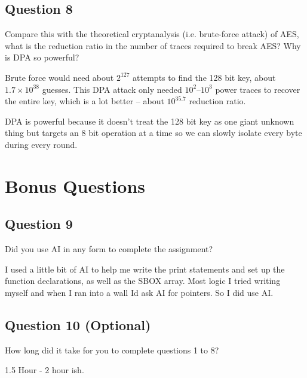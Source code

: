 \documentclass[11pt]{article}
\begin{document}
\subsection*{Question 8}
Compare this with the theoretical cryptanalysis (i.e. brute-force attack) of AES, what is the reduction ratio in the number of traces required to break AES? Why is DPA so powerful?

\bigskip
\noindent Brute force would need about $2^{127}$ attempts to find the 128 bit key, about $1.7\times10^{38}$ guesses. This DPA attack only needed $10^2$--$10^3$ power traces to recover the entire key, which is a lot better -- about $10^{35.7}$ reduction ratio.

DPA is powerful because it doesn't treat the 128 bit key as one giant unknown thing but targets an 8 bit operation at a time so we can slowly isolate every byte during every round.

\section*{Bonus Questions}

\subsection*{Question 9}
Did you use AI in any form to complete the assignment?

I used a little bit of AI to help me write the print statements and set up the function declarations, as well as the SBOX array. Most logic I tried writing myself and when I ran into a wall Id ask AI for pointers. So I did use AI.

\bigskip

\subsection*{Question 10 (Optional)}
How long did it take for you to complete questions 1 to 8?

1.5 Hour - 2 hour ish.

\bigskip
\end{document}
